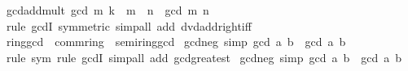 \begin{isabellebody}
\endisatagproof
{\isafoldproof}%
%
\isadelimproof
\isanewline
%
\endisadelimproof
\isanewline
{}\isamarkupfalse%
\ gcd{\isacharunderscore}{\kern0pt}add{\isacharunderscore}{\kern0pt}mult{\isacharcolon}{\kern0pt}\ {\isachardoublequoteopen}gcd\ m\ {\isacharparenleft}{\kern0pt}k\ {\isacharasterisk}{\kern0pt}\ m\ {\isacharplus}{\kern0pt}\ n{\isacharparenright}{\kern0pt}\ {\isacharequal}{\kern0pt}\ gcd\ m\ n{\isachardoublequoteclose}\isanewline
%
\isadelimproof
\ \ %
\endisadelimproof
%
\isatagproof
{}\isamarkupfalse%
\ {\isacharparenleft}{\kern0pt}rule\ gcdI\ {\isacharbrackleft}{\kern0pt}symmetric{\isacharbrackright}{\kern0pt}{\isacharparenright}{\kern0pt}\ {\isacharparenleft}{\kern0pt}simp{\isacharunderscore}{\kern0pt}all\ add{\isacharcolon}{\kern0pt}\ dvd{\isacharunderscore}{\kern0pt}add{\isacharunderscore}{\kern0pt}right{\isacharunderscore}{\kern0pt}iff{\isacharparenright}{\kern0pt}%
\endisatagproof
{\isafoldproof}%
%
\isadelimproof
\isanewline
%
\endisadelimproof
\isanewline
{}\isamarkupfalse%
\isanewline
\isanewline
{}\isamarkupfalse%
\ ring{\isacharunderscore}{\kern0pt}gcd\ {\isacharequal}{\kern0pt}\ comm{\isacharunderscore}{\kern0pt}ring{\isacharunderscore}{\kern0pt}{}\ {\isacharplus}{\kern0pt}\ semiring{\isacharunderscore}{\kern0pt}gcd\isanewline
{}\isanewline
\isanewline
{}\isamarkupfalse%
\ gcd{\isacharunderscore}{\kern0pt}neg{}\ {\isacharbrackleft}{\kern0pt}simp{\isacharbrackright}{\kern0pt}{\isacharcolon}{\kern0pt}\ {\isachardoublequoteopen}gcd\ {\isacharparenleft}{\kern0pt}{\isacharminus}{\kern0pt}a{\isacharparenright}{\kern0pt}\ b\ {\isacharequal}{\kern0pt}\ gcd\ a\ b{\isachardoublequoteclose}\isanewline
%
\isadelimproof
\ \ %
\endisadelimproof
%
\isatagproof
{}\isamarkupfalse%
\ {\isacharparenleft}{\kern0pt}rule\ sym{\isacharcomma}{\kern0pt}\ rule\ gcdI{\isacharparenright}{\kern0pt}\ {\isacharparenleft}{\kern0pt}simp{\isacharunderscore}{\kern0pt}all\ add{\isacharcolon}{\kern0pt}\ gcd{\isacharunderscore}{\kern0pt}greatest{\isacharparenright}{\kern0pt}%
\endisatagproof
{\isafoldproof}%
%
\isadelimproof
\isanewline
%
\endisadelimproof
\isanewline
{}\isamarkupfalse%
\ gcd{\isacharunderscore}{\kern0pt}neg{}\ {\isacharbrackleft}{\kern0pt}simp{\isacharbrackright}{\kern0pt}{\isacharcolon}{\kern0pt}\ {\isachardoublequoteopen}gcd\ a\ {\isacharparenleft}{\kern0pt}{\isacharminus}{\kern0pt}b{\isacharparenright}{\kern0pt}\ {\isacharequal}{\kern0pt}\ gcd\ a\ b{\isachardoublequoteclose}\isanewline
%
\isadelimproof

\end{isabellebody}
